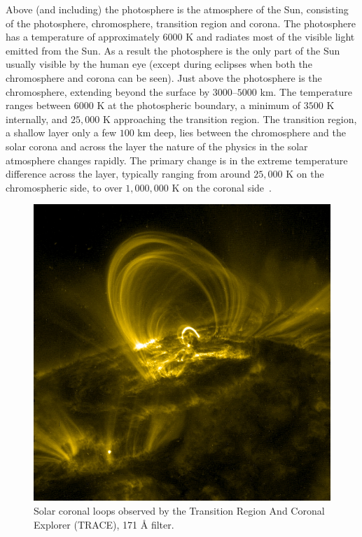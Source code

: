 Above (and including) the photosphere is the atmosphere of the Sun, consisting of the photosphere, chromosphere, transition region and corona. The photosphere has a temperature of approximately $6000$ K and radiates most of the visible light emitted from the Sun. As a result the photosphere is the only part of the Sun usually visible by the human eye (except during eclipses when both the chromosphere and corona can be seen). Just above the photosphere is the chromosphere, extending beyond the surface by $3000$--$5000$ km. The temperature ranges between $6000$ K at the photospheric boundary, a minimum of $3500$ K internally, and $25,000$ K approaching the transition region. The transition region, a shallow layer only a few $100$ km deep, lies between the chromosphere and the solar corona and across the layer the nature of the physics in the solar atmosphere changes rapidly. The primary change is in the extreme temperature difference across the layer, typically ranging from around $25,000$ K on the chromospheric side, to over $1,000,000$ K on the coronal side~\cite{priestMagnetohydrodynamicsSuna,mandriniMagneticFieldPlasma2000}.

\begin{figure}[t]
  \centering
  \includegraphics[width=0.5\linewidth]{Traceimage.jpg}
  \caption{Solar coronal loops observed by the Transition Region And Coronal Explorer (TRACE), 171 Å filter.}%
  \label{fig:coronal_loops}
\end{figure}

